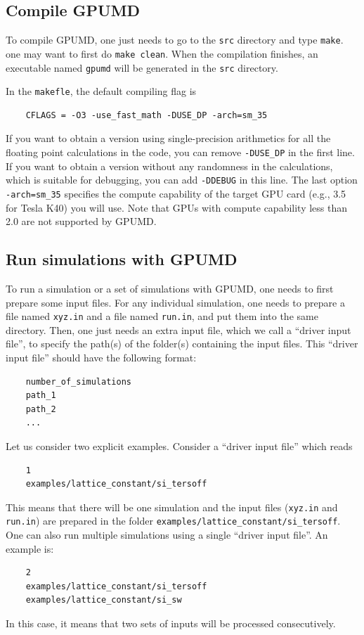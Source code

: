 \documentclass[12pt,a4paper]{report}
\begin{document}
\subsection{Compile GPUMD}

To compile GPUMD, one just needs to go to the \verb"src" directory and type \verb"make". one may want to first do \verb"make clean". When the compilation finishes, an executable named \verb"gpumd" will be generated in the \verb"src" directory.

In the \verb"makefle", the default compiling flag is
\begin{verbatim}
    CFLAGS = -O3 -use_fast_math -DUSE_DP -arch=sm_35
\end{verbatim}
If you want to obtain a version using single-precision arithmetics for all the floating point calculations in the code, you can remove \verb"-DUSE_DP" in the first line. If you want to obtain a version without any randomness in the calculations, which is suitable for debugging, you can add \verb"-DDEBUG" in this line. The last option \verb"-arch=sm_35" specifies the compute capability of the target GPU card (e.g., 3.5 for Tesla K40) you will use. Note that GPUs with compute capability less than 2.0 are not supported by GPUMD.

\subsection{Run simulations with GPUMD}

To run a simulation or a set of simulations with GPUMD, one needs to first prepare some input files. For any individual simulation, one needs to prepare a file named \verb"xyz.in" and a file named \verb"run.in", and put them into the same directory. Then, one just needs an extra input file, which we call a ``driver input file'', to specify the path(s) of the folder(s) containing the input files. This ``driver input file'' should have the following format:
\begin{verbatim}
    number_of_simulations
    path_1
    path_2
    ...
\end{verbatim}


Let us consider two explicit examples. Consider a ``driver input file'' which reads
\begin{verbatim}
    1
    examples/lattice_constant/si_tersoff
\end{verbatim}
This means that there will be one simulation and the input files (\verb"xyz.in" and \verb"run.in") are prepared in the folder \verb"examples/lattice_constant/si_tersoff". One can also run multiple simulations using a single ``driver input file''. An example is:
\begin{verbatim}
    2
    examples/lattice_constant/si_tersoff
    examples/lattice_constant/si_sw
\end{verbatim}
In this case, it means that two sets of inputs will be processed consecutively.
\end{document}
